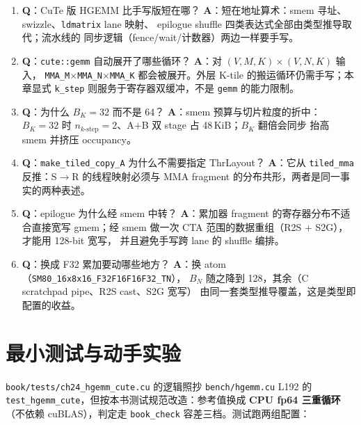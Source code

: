 \begin{enumerate}
  \item \textbf{Q}：CuTe 版 HGEMM 比手写版短在哪？
        \textbf{A}：短在地址算术：smem 寻址、swizzle、\texttt{ldmatrix} lane 映射、
        epilogue shuffle 四类表达式全部由类型推导取代；流水线的
        同步逻辑（fence/wait/计数器）两边一样要手写。
  \item \textbf{Q}：\texttt{cute::gemm} 自动展开了哪些循环？
        \textbf{A}：对 $(V,M,K)\times(V,N,K)$ 输入，
        \texttt{MMA\_M}$\times$\texttt{MMA\_N}$\times$\texttt{MMA\_K}
        都会被展开。外层 K-tile 的搬运循环仍需手写；本章显式
        \texttt{k\_step} 则服务于寄存器双缓冲，不是 \texttt{gemm} 的能力限制。
  \item \textbf{Q}：为什么 $B_K=32$ 而不是 64？
        \textbf{A}：smem 预算与切片粒度的折中：$B_K=32$ 时
        $n_{k\text{-step}}=2$、A$+$B 双 stage 占 48\,KiB；$B_K$ 翻倍会同步
        抬高 smem 并挤压 occupancy。
  \item \textbf{Q}：\texttt{make\_\allowbreak{}tiled\_\allowbreak{}copy\_\allowbreak{}A} 为什么不需要指定
        ThrLayout？
        \textbf{A}：它从 \texttt{tiled\_mma} 反推：S$\to$R 的线程映射必须与
        MMA fragment 的分布共形，两者是同一事实的两种表述。
  \item \textbf{Q}：epilogue 为什么经 smem 中转？
        \textbf{A}：累加器 fragment 的寄存器分布不适合直接宽写 gmem；经 smem
        做一次 CTA 范围的数据重组（R2S $+$ S2G），才能用 128-bit 宽写，
        并且避免手写跨 lane 的 shuffle 编排。
  \item \textbf{Q}：换成 F32 累加要动哪些地方？
        \textbf{A}：换 atom（\texttt{SM80\_\allowbreak{}16x8x16\_\allowbreak{}F32\allowbreak{}F16\allowbreak{}F16\allowbreak{}F32\_\allowbreak{}TN}），
        $B_N$ 随之降到 128，其余（C scratchpad pipe、R2S cast、S2G 宽写）
        由同一套类型推导覆盖，这是类型即配置的收益。
\end{enumerate}

\section{最小测试与动手实验}\label{sec:24-minitest}

\texttt{book/\allowbreak{}tests/\allowbreak{}ch24\_\allowbreak{}hgemm\_\allowbreak{}cute.cu} 的逻辑照抄 \texttt{bench/hgemm.cu}
L192 的 \texttt{test\_\allowbreak{}hgemm\_\allowbreak{}cute}，但按本书测试规范改造：参考值换成
\textbf{CPU fp64 三重循环}（不依赖 cuBLAS），判定走 \texttt{book\_check}
容差三档。测试跑两组配置：

